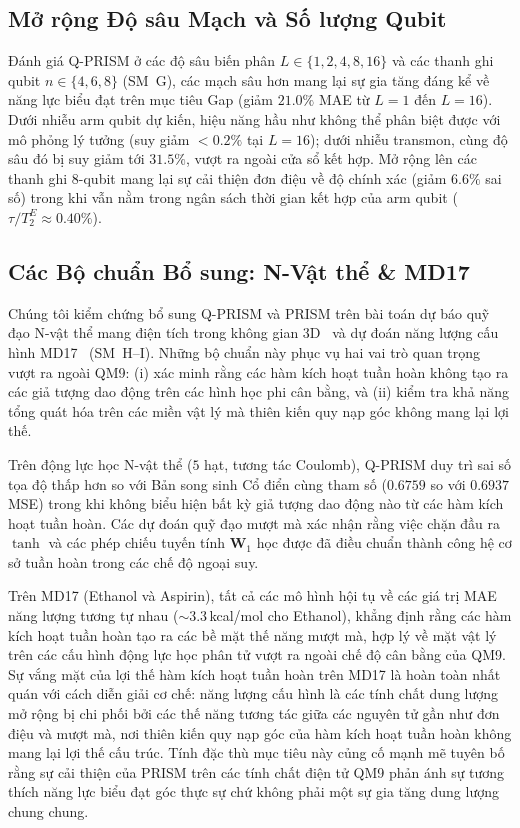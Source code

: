 \documentclass[10pt,twocolumn,letterpaper]{article}
\begin{document}
\subsection{Mở rộng Độ sâu Mạch và Số lượng Qubit}
\label{sec:circuit_scaling}

Đánh giá Q-PRISM ở các độ sâu biến phân $L \in \{1, 2, 4, 8, 16\}$ và các thanh ghi qubit $n \in \{4, 6, 8\}$ (SM~G), các mạch sâu hơn mang lại sự gia tăng đáng kể về năng lực biểu đạt trên mục tiêu Gap (giảm $21.0\%$ MAE từ $L = 1$ đến $L = 16$). Dưới nhiễu arm qubit dự kiến, hiệu năng hầu như không thể phân biệt được với mô phỏng lý tưởng (suy giảm $< 0.2\%$ tại $L = 16$); dưới nhiễu transmon, cùng độ sâu đó bị suy giảm tới $31.5\%$, vượt ra ngoài cửa sổ kết hợp. Mở rộng lên các thanh ghi 8-qubit mang lại sự cải thiện đơn điệu về độ chính xác (giảm $6.6\%$ sai số) trong khi vẫn nằm trong ngân sách thời gian kết hợp của arm qubit ($\tau/T_2^E \approx 0.40\%$).

\subsection{Các Bộ chuẩn Bổ sung: N-Vật thể \& MD17}
\label{sec:additional_benchmarks}

Chúng tôi kiểm chứng bổ sung Q-PRISM và PRISM trên bài toán dự báo quỹ đạo N-vật thể mang điện tích trong không gian 3D~\cite{satorras2022enequivariantgraphneural} và dự đoán năng lượng cấu hình MD17~\cite{chmielaMachineLearningAccurate2016} (SM~H--I). Những bộ chuẩn này phục vụ hai vai trò quan trọng vượt ra ngoài QM9: (i) xác minh rằng các hàm kích hoạt tuần hoàn không tạo ra các giả tượng dao động trên các hình học phi cân bằng, và (ii) kiểm tra khả năng tổng quát hóa trên các miền vật lý mà thiên kiến quy nạp góc không mang lại lợi thế.

Trên động lực học N-vật thể ($5$ hạt, tương tác Coulomb), Q-PRISM duy trì sai số tọa độ thấp hơn so với Bản song sinh Cổ điển cùng tham số ($0.6759$ so với $0.6937$ MSE) trong khi không biểu hiện bất kỳ giả tượng dao động nào từ các hàm kích hoạt tuần hoàn. Các dự đoán quỹ đạo mượt mà xác nhận rằng việc chặn đầu ra $\tanh$ và các phép chiếu tuyến tính $\mathbf{W}_1$ học được đã điều chuẩn thành công hệ cơ sở tuần hoàn trong các chế độ ngoại suy.

Trên MD17 (Ethanol và Aspirin), tất cả các mô hình hội tụ về các giá trị MAE năng lượng tương tự nhau ($\sim 3.3$\,kcal/mol cho Ethanol), khẳng định rằng các hàm kích hoạt tuần hoàn tạo ra các bề mặt thế năng mượt mà, hợp lý về mặt vật lý trên các cấu hình động lực học phân tử vượt ra ngoài chế độ cân bằng của QM9. Sự vắng mặt của lợi thế hàm kích hoạt tuần hoàn trên MD17 là hoàn toàn nhất quán với cách diễn giải cơ chế: năng lượng cấu hình là các tính chất dung lượng mở rộng bị chi phối bởi các thế năng tương tác giữa các nguyên tử gần như đơn điệu và mượt mà, nơi thiên kiến quy nạp góc của hàm kích hoạt tuần hoàn không mang lại lợi thế cấu trúc. Tính đặc thù mục tiêu này củng cố mạnh mẽ tuyên bố rằng sự cải thiện của PRISM trên các tính chất điện tử QM9 phản ánh sự tương thích năng lực biểu đạt góc thực sự chứ không phải một sự gia tăng dung lượng chung chung.
\end{document}
